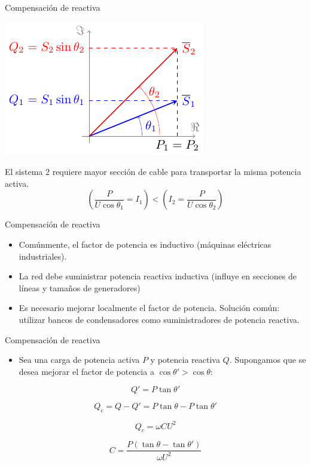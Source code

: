 \documentclass[xcolor={usenames,svgnames,dvipsnames}]{beamer}
\begin{document}
\begin{frame}[label={sec:orgf29f66e}]{Compensación de reactiva}
\begin{center}
\includegraphics[height=0.5\textheight]{../figs/compensacionReactiva.pdf}
\end{center}

El sistema 2 requiere \alert{mayor sección} de cable para transportar la misma potencia activa.
\[
  \left(\frac{P}{U \cos \theta_1} = I_1 \right) < \left( I_2 = \frac{P}{U \cos \theta_2}\right) 
\]
\end{frame}

\begin{frame}[label={sec:org10a2a68}]{Compensación de reactiva}
\begin{itemize}
\item Comúnmente, el factor de potencia es \alert{inductivo} (máquinas eléctricas
industriales).

\item La red debe suministrar potencia reactiva inductiva (influye en secciones de líneas y tamaños de generadores)

\item Es necesario mejorar \alert{localmente} el factor de potencia. Solución
común: utilizar \alert{bancos de condensadores} como suministradores de
potencia reactiva.
\end{itemize}
\end{frame}

\begin{frame}[label={sec:org58d53e4}]{Compensación de reactiva}
\begin{itemize}
\item Sea una carga de potencia activa \(P\) y potencia reactiva \(Q\). Supongamos que se desea mejorar el factor de potencia a \(\cos \theta' > \cos \theta\):
\end{itemize}

\[
  Q' = P \tan \theta'
\]

\[
  Q_c = Q - Q' = P \tan \theta - P \tan \theta'
\]

\[
  Q_c = \omega C U^2
\]

\[
\boxed{C = \frac{P (\tan \theta - \tan \theta')}{\omega U^2}}
\]
\end{frame}
\end{document}
